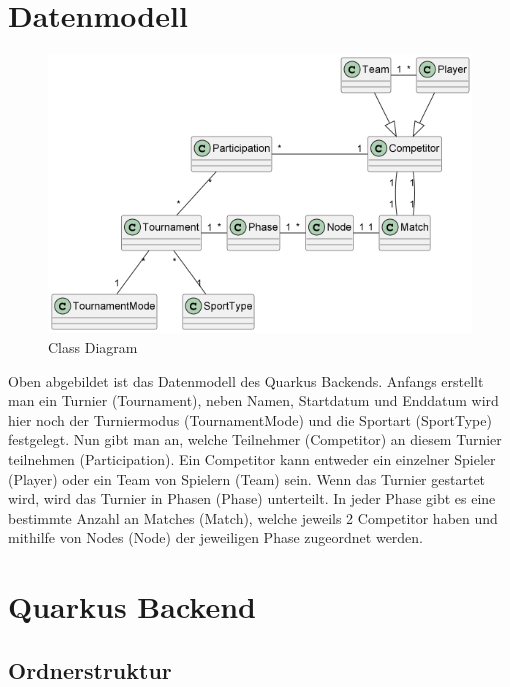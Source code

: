 \section{Datenmodell}

\begin{figure}[H]
    \includegraphics[scale=1]{pics/class_diagram.png}
    \caption{Class Diagram}
\end{figure}

Oben abgebildet ist das Datenmodell des Quarkus Backends. Anfangs erstellt man ein Turnier (Tournament), neben Namen, Startdatum und Enddatum 
wird hier noch der Turniermodus (TournamentMode) und die Sportart (SportType) festgelegt. Nun gibt man an, welche Teilnehmer (Competitor) an diesem Turnier teilnehmen (Participation). 
Ein Competitor kann entweder ein einzelner Spieler (Player) oder ein Team von Spielern (Team) sein.
Wenn das Turnier gestartet wird, wird das Turnier in Phasen (Phase) unterteilt. In jeder Phase gibt es eine bestimmte Anzahl an Matches (Match), welche jeweils 2 Competitor haben und mithilfe von Nodes (Node) 
der jeweiligen Phase zugeordnet werden.

\section{Quarkus Backend}

\subsection{Ordnerstruktur}

